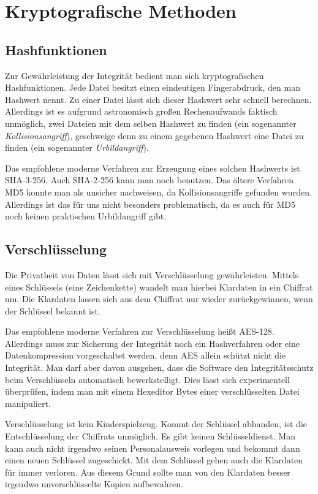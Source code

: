 \documentclass[a4paper,11pt,fleqn,twocolumn,twoside]{scrartcl}
\begin{document}
\section{Kryptografische Methoden}

\subsection{Hashfunktionen}

Zur Gewährleistung der Integrität bedient man sich kryptografischen
Hashfunktionen. Jede Datei besitzt einen eindeutigen Fingerabdruck,
den man Hashwert nennt. Zu einer Datei lässt sich dieser Hashwert
sehr schnell berechnen. Allerdings ist es aufgrund astronomisch großen
Rechenaufwands faktisch unmöglich, zwei Dateien mit dem selben Hashwert
zu finden (ein sogenannter \emph{Kollisionsangriff}), geschweige denn
zu einem gegebenen Hashwert eine Datei zu finden (ein sogenannter
\emph{Urbildangriff}).

Das empfohlene moderne Verfahren zur Erzeugung eines solchen
Hashwerts ist SHA-3-256. Auch SHA-2-256 kann man noch
benutzen. Das ältere Verfahren MD5 konnte man als unsicher
nachweisen, da Kollisionsangriffe gefunden wurden. Allerdings
ist das für uns nicht besonders problematisch, da es auch für MD5
noch keinen praktischen Urbildangriff gibt.

\subsection{Verschlüsselung}

Die Privatheit von Daten lässt sich mit Verschlüsselung
gewährleisten. Mittels eines Schlüssels (eine Zeichenkette)
wandelt man hierbei Klardaten in ein Chiffrat um. Die Klardaten lassen
sich aus dem Chiffrat nur wieder zurückgewinnen, wenn der Schlüssel
bekannt ist.

Das empfohlene moderne Verfahren zur Verschlüsselung
heißt AES-128. Allerdings muss zur Sicherung der Integrität noch
ein Hashverfahren oder eine Datenkompression vorgeschaltet werden,
denn AES allein schützt nicht die Integrität. Man darf aber davon
ausgehen, dass die Software den Integritätsschutz beim Verschlüsseln
automatisch bewerkstelligt. Dies lässt sich experimentell überprüfen,
indem man mit einem Hexeditor Bytes einer verschlüsselten Datei
manipuliert.

Verschlüsselung ist kein Kinderspielzeug. Kommt der Schlüssel
abhanden, ist die Entschlüsselung der Chiffrats unmöglich.
Es gibt keinen Schlüsseldienst. Man kann auch nicht irgendwo
seinen Personalausweis vorlegen und bekommt dann einen neuen
Schlüssel zugeschickt. Mit dem Schlüssel gehen auch die Klardaten
für immer verloren. Aus diesem Grund sollte man von den Klardaten
besser irgendwo unverschlüsselte Kopien aufbewahren.
\end{document}
